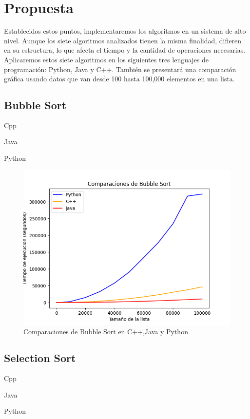 \newpage

\section{Propuesta}

Establecidos estos puntos, implementaremos los algoritmos en un sistema de alto nivel. Aunque los siete algoritmos analizados tienen la misma finalidad, difieren en su estructura, lo que afecta el tiempo y la cantidad de operaciones necesarias. Aplicaremos estos siete algoritmos en los siguientes tres lenguajes de programación: Python, Java y C++. También se presentará una comparación gráfica usando datos que van desde 100 hasta 100,000 elementos en una lista.

\subsection{Bubble Sort} 
Cpp


Java


\vspace{5cm}
Python


\begin{figure}[h]
    \centering
    \includegraphics[scale=.60]{img/bubble sort.png}
    \caption{Comparaciones de Bubble Sort en C++,Java y Python}
    \label{fig:primera_figura}
\end{figure}

\subsection{Selection Sort}
Cpp

Java

\vspace{1cm}
Python


